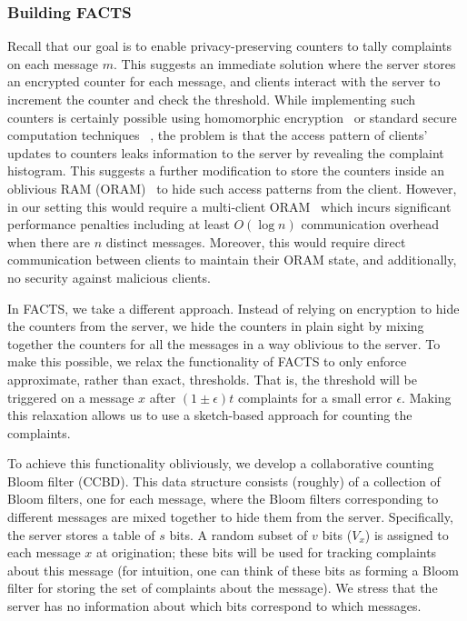 \subsubsection{Building FACTS}
Recall that our goal is to enable privacy-preserving counters to tally complaints on each message $m$.  This suggests an immediate solution where the server stores an encrypted counter for each message, and clients interact with the server to increment the counter and check the threshold.  While implementing such counters is certainly possible using homomorphic encryption~\cite{STOC:Gentry09} or standard secure computation techniques~\cite{FOCS:Yao86, STOC:GolMicWig87, STOC:BenGolWig88} , the problem is that the access pattern of clients' updates to counters leaks information to the server by revealing the complaint histogram.  
This suggests a further modification to store the counters inside an oblivious RAM (ORAM)~\cite{JACM:GolOst96} to hide such access patterns from the client.  However, in our setting this would require a multi-client ORAM~\cite{maffei-msmcoram,concuroram,MOSE} which incurs significant performance penalties including at least $O(\log{n})$ communication overhead when there are $n$ distinct messages.  Moreover, this would require direct communication between clients to maintain their ORAM state, and additionally, no security against malicious clients.

In FACTS, we take a different approach.  Instead of relying on encryption to hide the counters from the server, we hide the counters in plain sight by mixing together the counters for all the messages in a way oblivious to the server.  To make this possible, we relax the functionality of FACTS to only enforce approximate, rather than exact, thresholds.  That is, the threshold will be triggered on a message $x$ after $(1\pm \epsilon) t$ complaints for a small error $\epsilon$.
Making this relaxation allows us to use a sketch-based approach for counting the complaints.  

To achieve this functionality obliviously, we develop a collaborative counting Bloom filter (CCBD).
This data structure consists (roughly) of a collection of Bloom filters, one for each message, where the Bloom filters corresponding to different messages are mixed together to hide them from the server. Specifically, the server stores a table of $s$ bits.  A random subset of $v$ bits ($V_x$) is assigned to each message $x$ at origination; these bits will be used for tracking complaints about this message (for intuition, one can think of these bits as forming a Bloom filter for storing the set of complaints about the message).  We stress that the server has no information about which bits correspond to which messages. 


